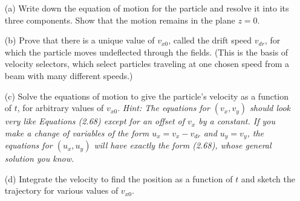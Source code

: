 \documentclass[12pt]{article}
\begin{document}
\begin{enumerate}
    \item[(a)] Write down the equation of motion for the particle and resolve it into its three components. Show that the motion remains in the plane \( z = 0 \).

   
    \item[(b)] Prove that there is a unique value of \( v_{x0} \), called the drift speed \( v_{dr} \), for which the particle moves undeflected through the fields. (This is the basis of velocity selectors, which select particles traveling at one chosen speed from a beam with many different speeds.)
    
    \item[(c)] Solve the equations of motion to give the particle’s velocity as a function of \( t \), for arbitrary values of \( v_{x0} \). \textit{Hint: The equations for \( (v_x, v_y) \) should look very like Equations (2.68) except for an offset of \( v_x \) by a constant. If you make a change of variables of the form \( u_x = v_x - v_{dr} \) and \( u_y = v_y \), the equations for \( (u_x, u_y) \) will have exactly the form (2.68), whose general solution you know.}
    
    \item[(d)] Integrate the velocity to find the position as a function of \( t \) and sketch the trajectory for various values of \( v_{x0} \).


\end{enumerate}
\end{document}
